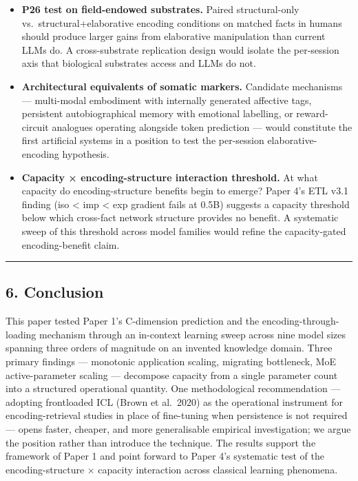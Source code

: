\documentclass[
]{article}
\begin{document}
\begin{itemize}
\item
  \textbf{P26 test on field-endowed substrates.} Paired structural-only
  vs.~structural+elaborative encoding conditions on matched facts in
  humans should produce larger gains from elaborative manipulation than
  current LLMs do. A cross-substrate replication design would isolate
  the per-session axis that biological substrates access and LLMs do
  not.
\item
  \textbf{Architectural equivalents of somatic markers.} Candidate
  mechanisms --- multi-modal embodiment with internally generated
  affective tags, persistent autobiographical memory with emotional
  labelling, or reward-circuit analogues operating alongside token
  prediction --- would constitute the first artificial systems in a
  position to test the per-session elaborative-encoding hypothesis.
\item
  \textbf{Capacity × encoding-structure interaction threshold.} At what
  capacity do encoding-structure benefits begin to emerge? Paper 4's ETL
  v3.1 finding (iso \textless{} imp \textless{} exp gradient fails at
  0.5B) suggests a capacity threshold below which cross-fact network
  structure provides no benefit. A systematic sweep of this threshold
  across model families would refine the capacity-gated encoding-benefit
  claim.
\end{itemize}

\begin{center}\rule{0.5\linewidth}{0.5pt}\end{center}

\subsection{6. Conclusion}\label{conclusion}

This paper tested Paper 1's C-dimension prediction and the
encoding-through-loading mechanism through an in-context learning sweep
across nine model sizes spanning three orders of magnitude on an
invented knowledge domain. Three primary findings --- monotonic
application scaling, migrating bottleneck, MoE active-parameter scaling
--- decompose capacity from a single parameter count into a structured
operational quantity. One methodological recommendation --- adopting
frontloaded ICL (Brown et al.~2020) as the operational instrument for
encoding-retrieval studies in place of fine-tuning when persistence is
not required --- opens faster, cheaper, and more generalisable empirical
investigation; we argue the position rather than introduce the
technique. The results support the framework of Paper 1 and point
forward to Paper 4's systematic test of the encoding-structure ×
capacity interaction across classical learning phenomena.
\end{document}
